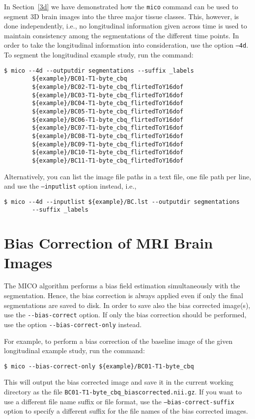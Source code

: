 \documentclass[a4paper,12pt]{article}
\begin{document}
In Section~\ref{3d} we have demonstrated how the \texttt{mico} command can
be used to segment 3D brain images into the three major tissue classes. This,
however, is done independently, i.e., no longitudinal information given
across time is used to maintain consistency among the segmentations of the
different time points. In order to take the longitudinal information into
consideration, use the option \texttt{--4d}. To segment the longitudinal
example study, run the command:
\footnotesize
\begin{verbatim}
$ mico --4d --outputdir segmentations --suffix _labels
        ${example}/BC01-T1-byte_cbq
        ${example}/BC02-T1-byte_cbq_flirtedToY16dof
        ${example}/BC03-T1-byte_cbq_flirtedToY16dof
        ${example}/BC04-T1-byte_cbq_flirtedToY16dof
        ${example}/BC05-T1-byte_cbq_flirtedToY16dof
        ${example}/BC06-T1-byte_cbq_flirtedToY16dof
        ${example}/BC07-T1-byte_cbq_flirtedToY16dof
        ${example}/BC08-T1-byte_cbq_flirtedToY16dof
        ${example}/BC09-T1-byte_cbq_flirtedToY16dof
        ${example}/BC10-T1-byte_cbq_flirtedToY16dof
        ${example}/BC11-T1-byte_cbq_flirtedToY16dof
\end{verbatim}
\normalsize
Alternatively, you can list the image file paths in a text file, one file path
per line, and use the \texttt{--inputlist} option instead, i.e.,
\footnotesize
\begin{verbatim}
$ mico --4d --inputlist ${example}/BC.lst --outputdir segmentations
        --suffix _labels
\end{verbatim}
\normalsize

\section{Bias Correction of MRI Brain Images}
\label{bc}

The MICO algorithm performs a bias field estimation simultaneously with the
segmentation. Hence, the bias correction is always applied even if only the
final segmentations are saved to disk. In order to save also the bias corrected
image(s), use the \texttt{-{-}bias-correct} option. If only the bias correction
should be performed, use the option \texttt{-{-}bias-correct-only} instead.

For example, to perform a bias correction of the baseline image of the given
longitudinal example study, run the command:
\footnotesize
\begin{verbatim}
$ mico --bias-correct-only ${example}/BC01-T1-byte_cbq
\end{verbatim}
\normalsize
This will output the bias corrected image and save it in the current working \linebreak
directory as the file \texttt{BC01-T1-byte{\_}cbq{\_}biascorrected.nii.gz}.
If you want to use a different file name suffix or file format, use the
\texttt{--bias-correct-suffix} option to specify a different suffix for the
file names of the bias corrected images.
\end{document}
